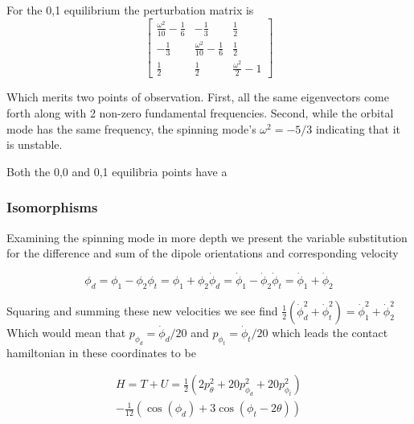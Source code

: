 \documentclass[12pt]{amsart}
\begin{document}
For the 0,1 equilibrium the perturbation matrix is 
\begin{equation}
	\left[\begin{matrix}\frac{\omega^{2}}{10} - \frac{1}{6} & - \frac{1}{3} & \frac{1}{2}\\
	- \frac{1}{3} & \frac{\omega^{2}}{10} - \frac{1}{6} & \frac{1}{2}\\
	\frac{1}{2} & \frac{1}{2} & \frac{\omega^{2}}{2} - 1\end{matrix}\right]\end{equation}

Which merits two points of observation. First, all the same eigenvectors come forth along with 2 non-zero fundamental frequencies. Second, while the orbital mode has the same frequency, the spinning mode's $\omega^2=-5/3$ indicating that it is unstable.

Both the 0,0 and 0,1 equilibria points have a 


\subsubsection{Isomorphisms} Examining the spinning mode in more depth we present the variable substitution for the difference and sum of the dipole orientations and corresponding velocity

\begin{subequations}
	\begin{equation}
		\phi_d = \phi_1-\phi_2
	\end{equation}
	\begin{equation}
		\phi_t = \phi_1+\phi_2
	\end{equation}
	\begin{equation}
		\dot\phi_d = \dot\phi_1-\dot\phi_2
	\end{equation}
	\begin{equation}
		\dot\phi_t = \dot\phi_1+\dot\phi_2
	\end{equation}
\end{subequations}

Squaring and summing these new velocities we see find 
$\frac{1}{2}(\dot\phi_d^2 + \dot\phi_t^2) = \dot\phi_1^2+\dot\phi_2^2$
Which would mean that $p_{\phi_d}=\dot\phi_d/20$ and $p_{\phi_t}=\dot\phi_t/20$ which leads the contact hamiltonian in these coordinates to be

\begin{equation}
  \begin{multlined}
	H=T+U=
	\frac{1}{2}\left (
	2 p_\theta^2
	+20 p_{\phi_d}^2 
	+20 p_{\phi_t}^2      
        \right )
        \\
	-
	\frac{1}{12}
	(
	        \cos(\phi_d)
	        +3\cos(\phi_t-2\theta)
	    )
  \end{multlined}
\end{equation}
\end{document}
